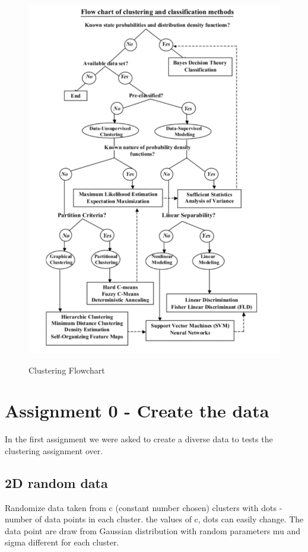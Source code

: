 \documentclass[12pt, a4paper]{paper}
\begin{document}
\begin{figure}[h!]
\centering
\includegraphics[scale=0.9]{clustering.png} \\
\caption{Clustering Flowchart}
\label{figure:Clustering Flowchart}
\end{figure}

\newpage

\section*{Assignment 0 - Create the data}
In the first assignment we were asked to create a diverse data to tests the clustering assignment over.

\subsection*{2D random data}
Randomize data taken from c (constant number chosen) clusters with dots - number of data points in each cluster. the values of c, dots can easily change. 
The data point are draw from Gaussian distribution with random parameters mu and sigma different for each cluster.
\end{document}

